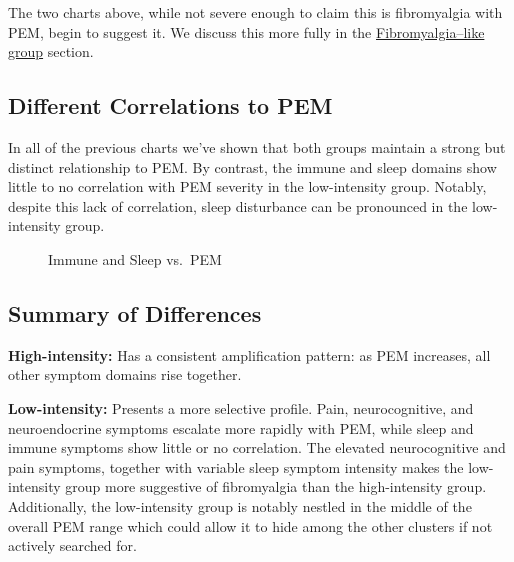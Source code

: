 \documentclass[
  letterpaper,
  DIV=11,
  numbers=noendperiod]{scrartcl}
\begin{document}
\FloatBarrier

The two charts above, while not severe enough to claim this is
fibromyalgia with PEM, begin to suggest it. We discuss this more fully
in the \hyperref[sec-fibro]{Fibromyalgia--like group} section.

\subsection{Different Correlations to
PEM}\label{different-correlations-to-pem}

In all of the previous charts we've shown that both groups maintain a
strong but distinct relationship to PEM. By contrast, the immune and
sleep domains show little to no correlation with PEM severity in the
low-intensity group. Notably, despite this lack of correlation, sleep
disturbance can be pronounced in the low-intensity group.

\begin{figure}[h]


\caption{\label{fig-distinct}Immune and Sleep vs.~PEM}

\end{figure}%

\FloatBarrier

\subsection{Summary of Differences}\label{summary-of-differences}

\textbf{High-intensity:} Has a consistent amplification pattern: as PEM
increases, all other symptom domains rise together.

\textbf{Low-intensity:} Presents a more selective profile. Pain,
neurocognitive, and neuroendocrine symptoms escalate more rapidly with
PEM, while sleep and immune symptoms show little or no correlation. The
elevated neurocognitive and pain symptoms, together with variable sleep
symptom intensity makes the low-intensity group more suggestive of
fibromyalgia than the high-intensity group. Additionally, the
low-intensity group is notably nestled in the middle of the overall PEM
range which could allow it to hide among the other clusters if not
actively searched for.
\end{document}
